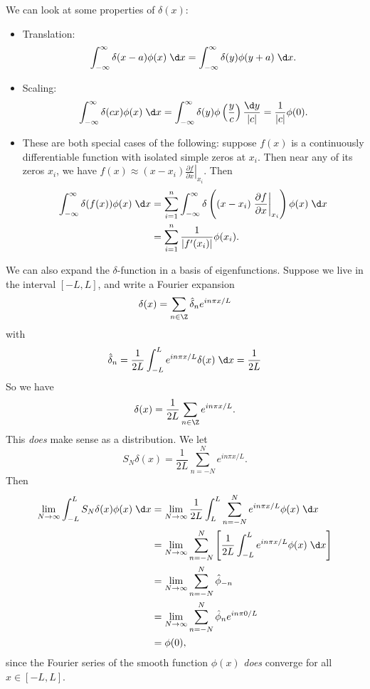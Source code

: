 \documentclass[a4paper]{article}
\begin{document}
We can look at some properties of $\delta(x)$:
\begin{itemize}
  \item Translation:
    \[
      \int_{-\infty}^\infty \delta(x - a) \phi(x)\;\d x = \int_{-\infty}^\infty \delta(y) \phi(y + a)\;\d x.
    \]
  \item Scaling:
    \[
      \int_{-\infty}^\infty \delta(cx) \phi(x)\;\d x = \int_{-\infty}^\infty \delta(y) \phi\left(\frac{y}{c}\right) \frac{\d y}{|c|} = \frac{1}{|c|}\phi(0).
    \]
  \item These are both special cases of the following: suppose $f(x)$ is a continuously differentiable function with isolated simple zeros at $x_i$. Then near any of its zeros $x_i$, we have $f(x) \approx (x - x_i) \left.\frac{\partial f}{\partial x}\right|_{x_i}$. Then
    \begin{align*}
      \int_{-\infty}^\infty \delta(f(x)) \phi(x)\;\d x &= \sum_{i = 1}^n \int_{-\infty}^\infty \delta\left((x - x_i)\left.\frac{\partial f}{\partial x}\right|_{x_i}\right) \phi(x)\;\d x \\
      &= \sum_{i = 1}^n \frac{1}{|f'(x_i)|} \phi(x_i).
    \end{align*}
\end{itemize}
We can also expand the $\delta$-function in a basis of eigenfunctions. Suppose we live in the interval $[-L, L]$, and write a Fourier expansion
\[
  \delta(x) = \sum_{n \in \Z}\hat{\delta}_n e^{in\pi x/L}
\]
with
\[
  \hat{\delta}_n = \frac{1}{2L} \int_{-L}^L e^{in\pi x/L}\delta(x)\;\d x = \frac{1}{2L}
\]
So we have
\[
  \delta(x) = \frac{1}{2L} \sum_{n \in \Z} e^{in\pi x/L}.
\]
This \emph{does} make sense as a distribution. We let
\[
  S_N \delta(x) = \frac{1}{2L} \sum_{n = -N}^N e^{in \pi x/L}.
\]
Then
\begin{align*}
  \lim_{N \to \infty} \int_{-L}^L S_N \delta(x) \phi(x)\;\d x &= \lim_{N \to \infty} \frac{1}{2L}\int_{L}^L \sum_{n = -N}^N e^{in\pi x/L}\phi(x) \;\d x\\
  &= \lim_{N \to \infty} \sum_{n = -N}^N \left[\frac{1}{2L}\int_{-L}^L e^{in\pi x/L} \phi(x) \;\d x\right]\\
  &= \lim_{N\to \infty} \sum_{n = -N}^N \hat{\phi}_{-n}\\
  &= \lim_{N \to \infty}\sum_{n = -N}^N \hat{\phi}_n e^{in\pi 0/L}\\
  &= \phi(0),
\end{align*}
since the Fourier series of the smooth function $\phi(x)$ \emph{does} converge for all $x \in [-L, L]$.
\end{document}
